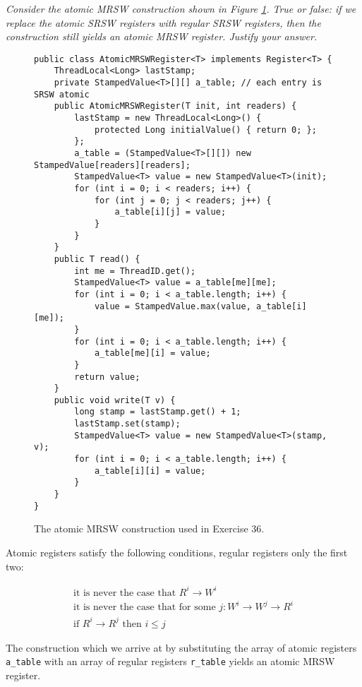 \documentclass[a4paper,10pt]{article}
\begin{document}
\emph{Consider the atomic MRSW construction shown in Figure \ref{fig:atomicmrsw}. True
or false: if we replace the atomic SRSW registers with regular SRSW registers,
then the construction still yields an atomic MRSW register. Justify your answer.}

\vspace{3mm}

\begin{figure}
\begin{lstlisting}
public class AtomicMRSWRegister<T> implements Register<T> {
    ThreadLocal<Long> lastStamp;
    private StampedValue<T>[][] a_table; // each entry is SRSW atomic
    public AtomicMRSWRegister(T init, int readers) {
        lastStamp = new ThreadLocal<Long>() {
            protected Long initialValue() { return 0; };
        };
        a_table = (StampedValue<T>[][]) new StampedValue[readers][readers];
        StampedValue<T> value = new StampedValue<T>(init);
        for (int i = 0; i < readers; i++) {
            for (int j = 0; j < readers; j++) {
                a_table[i][j] = value;
            }
        }
    }
    public T read() {
        int me = ThreadID.get();
        StampedValue<T> value = a_table[me][me];
        for (int i = 0; i < a_table.length; i++) {
            value = StampedValue.max(value, a_table[i][me]);
        }
        for (int i = 0; i < a_table.length; i++) {
            a_table[me][i] = value;
        }
        return value;
    }
    public void write(T v) {
        long stamp = lastStamp.get() + 1;
        lastStamp.set(stamp);
        StampedValue<T> value = new StampedValue<T>(stamp, v);
        for (int i = 0; i < a_table.length; i++) {
            a_table[i][i] = value;
        }
    }
}
\end{lstlisting}
\caption{The atomic MRSW construction used in Exercise 36.}
\label{fig:atomicmrsw}
\end{figure}

Atomic registers satisfy the following conditions, regular registers only the first two:

\begin{gather}
\text{it is never the case that } R^i \rightarrow W^i \\
\text{it is never the case that for some } j: W^i \rightarrow W^j \rightarrow R^i \\
\text{if } R^i \rightarrow R^j \text{ then } i \leq j
\end{gather}

The construction which we arrive at by substituting the array of atomic
registers \lstinline|a_table| with an array of regular registers
\lstinline|r_table| yields an atomic MRSW register.
\end{document}
